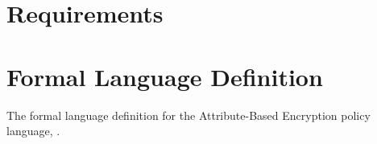 \section{Requirements}
\label{sec:design_reqs}



\section{Formal Language Definition}
\label{sec:formal_lang}
The formal language definition for the Attribute-Based Encryption policy language, \thePolicyLang.











